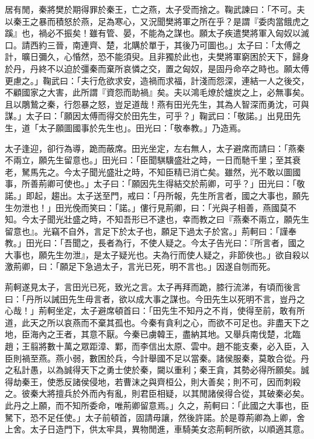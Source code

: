 \begin{pinyinscope}
居有閒，秦將樊於期得罪於秦王，亡之燕，太子受而捨之。鞠武諫曰：「不可。夫以秦王之暴而積怒於燕，足為寒心，又況聞樊將軍之所在乎？是謂『委肉當餓虎之蹊』也，禍必不振矣！雖有管、晏，不能為之謀也。願太子疾遣樊將軍入匈奴以滅口。請西約三晉，南連齊、楚，北購於單于，其後乃可圖也。」太子曰：「太傅之計，曠日彌久，心惛然，恐不能須臾。且非獨於此也，夫樊將軍窮困於天下，歸身於丹，丹終不以迫於彊秦而棄所哀憐之交，置之匈奴，是固丹命卒之時也。願太傅更慮之。」鞠武曰：「夫行危欲求安，造禍而求福，計淺而怨深，連結一人之後交，不顧國家之大害，此所謂『資怨而助禍』矣。夫以鴻毛燎於爐炭之上，必無事矣。且以鵰鷙之秦，行怨暴之怒，豈足道哉！燕有田光先生，其為人智深而勇沈，可與謀。」太子曰：「願因太傅而得交於田先生，可乎？」鞠武曰：「敬諾。」出見田先生，道「太子願圖國事於先生也」。田光曰：「敬奉教。」乃造焉。

太子逢迎，卻行為導，跪而蔽席。田光坐定，左右無人，太子避席而請曰：「燕秦不兩立，願先生留意也。」田光曰：「臣聞騏驥盛壯之時，一日而馳千里；至其衰老，駑馬先之。今太子聞光盛壯之時，不知臣精已消亡矣。雖然，光不敢以圖國事，所善荊卿可使也。」太子曰：「願因先生得結交於荊卿，可乎？」田光曰：「敬諾。」即起，趨出。太子送至門，戒曰：「丹所報，先生所言者，國之大事也，願先生勿泄也！」田光俛而笑曰：「諾。」僂行見荊卿，曰：「光與子相善，燕國莫不知。今太子聞光壯盛之時，不知吾形已不逮也，幸而教之曰『燕秦不兩立，願先生留意也』。光竊不自外，言足下於太子也，願足下過太子於宮。」荊軻曰：「謹奉教。」田光曰：「吾聞之，長者為行，不使人疑之。今太子告光曰：『所言者，國之大事也，願先生勿泄』，是太子疑光也。夫為行而使人疑之，非節俠也。」欲自殺以激荊卿，曰：「願足下急過太子，言光已死，明不言也。」因遂自刎而死。

荊軻遂見太子，言田光已死，致光之言。太子再拜而跪，膝行流涕，有頃而後言曰：「丹所以誡田先生毋言者，欲以成大事之謀也。今田先生以死明不言，豈丹之心哉！」荊軻坐定，太子避席頓首曰：「田先生不知丹之不肖，使得至前，敢有所道，此天之所以哀燕而不棄其孤也。今秦有貪利之心，而欲不可足也。非盡天下之地，臣海內之王者，其意不厭。今秦已虜韓王，盡納其地。又舉兵南伐楚，北臨趙；王翦將數十萬之眾距漳、鄴，而李信出太原、雲中。趙不能支秦，必入臣，入臣則禍至燕。燕小弱，數困於兵，今計舉國不足以當秦。諸侯服秦，莫敢合從。丹之私計愚，以為誠得天下之勇士使於秦，闚以重利；秦王貪，其勢必得所願矣。誠得劫秦王，使悉反諸侯侵地，若曹沫之與齊桓公，則大善矣；則不可，因而刺殺之。彼秦大將擅兵於外而內有亂，則君臣相疑，以其閒諸侯得合從，其破秦必矣。此丹之上願，而不知所委命，唯荊卿留意焉。」久之，荊軻曰：「此國之大事也，臣駑下，恐不足任使。」太子前頓首，固請毋讓，然後許諾。於是尊荊卿為上卿，舍上舍。太子日造門下，供太牢具，異物閒進，車騎美女恣荊軻所欲，以順適其意。


\end{pinyinscope}
